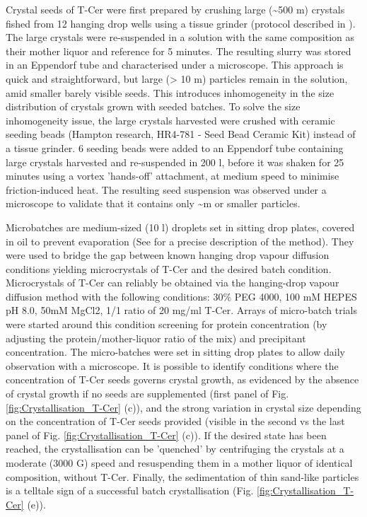 Crystal seeds of T-Cer were first prepared by crushing large (\textasciitilde 500 \textmu m) crystals fished from 12 hanging drop wells using a tissue grinder (protocol described in \parencite{aumonierTimeresolvedMonochromaticSynchrotron2019}). The large crystals were re-suspended in a solution with the same composition as their mother liquor and reference for 5 minutes. The resulting slurry was stored in an Eppendorf tube and characterised under a microscope. This approach is quick and straightforward, but large (> 10 \textmu m) particles remain in the solution, amid smaller barely visible seeds. This introduces inhomogeneity in the size distribution of crystals grown with seeded batches. To solve the size inhomogeneity issue, the large crystals harvested were crushed with ceramic seeding beads (Hampton research, HR4-781 - Seed Bead Ceramic Kit) instead of a tissue grinder. 6 seeding beads were added to an Eppendorf tube containing large crystals harvested and re-suspended in 200 \textmu l, before it was shaken for 25 minutes using a vortex 'hands-off' attachment, at medium speed to minimise friction-induced heat. The resulting seed suspension was observed under a microscope to validate that it contains only \textasciitilde  \textmu m or smaller particles.

Microbatches are medium-sized (10 \textmu l) droplets set in sitting drop plates, covered in oil to prevent evaporation (See \cite{chayenMicrobatchCrystallizationOil1992} for a precise description of the method). They were used to bridge the gap between known hanging drop vapour diffusion conditions yielding microcrystals of T-Cer and the desired batch condition.  Microcrystals of T-Cer can reliably be obtained via the hanging-drop vapour diffusion method with the following conditions: 30\% PEG 4000, 100 mM HEPES pH 8.0, 50mM MgCl2, 1/1 ratio of 20 mg/ml T-Cer. Arrays of micro-batch trials were started around this condition screening for protein concentration (by adjusting the protein/mother-liquor ratio of the mix) and precipitant concentration. The micro-batches were set in sitting drop plates to allow daily observation with a microscope.  It is possible to identify conditions where the concentration of T-Cer seeds governs crystal growth, as evidenced by the absence of crystal growth if no seeds are supplemented (first panel of Fig. \ref{fig:Crystallisation_T-Cer} (c)), and the strong variation in crystal size depending on the concentration of T-Cer seeds provided (visible in the second vs the last panel of Fig. \ref{fig:Crystallisation_T-Cer} (c)). If the desired state has been reached, the crystallisation can be 'quenched' by centrifuging the crystals at a moderate (3000 G) speed and resuspending them in a mother liquor of identical composition, without T-Cer.  Finally, the sedimentation of thin sand-like particles is a telltale sign of a successful batch crystallisation (Fig. \ref{fig:Crystallisation_T-Cer} (e)). 

